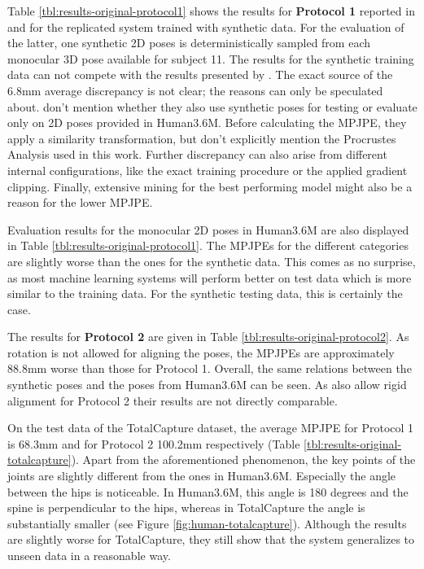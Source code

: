 



Table \ref{tbl:results-original-protocol1} shows the results for \textbf{Protocol 1} reported in \cite{drover18} and for the replicated system trained with synthetic data.
For the evaluation of the latter, one synthetic 2D poses is deterministically sampled from each monocular 3D pose available for subject 11.
The results for the synthetic training data can not compete with the results presented by \citet{drover18}.
The exact source of the 6.8mm average discrepancy is not clear; the reasons can only be speculated about.
\citet{drover18} don't mention whether they also use synthetic poses for testing or evaluate only on 2D poses provided in Human3.6M.
Before calculating the MPJPE, they apply a similarity transformation, but don't explicitly mention the Procrustes Analysis used in this work.
Further discrepancy can also arise from different internal configurations, like the exact training procedure or the applied gradient clipping.
Finally, extensive mining for the best performing model might also be a reason for the lower MPJPE.

Evaluation results for the monocular 2D poses in Human3.6M are also displayed in Table \ref{tbl:results-original-protocol1}.
The MPJPEs for the different categories are slightly worse than the ones for the synthetic data.
This comes as no surprise, as most machine learning systems will perform better on test data which is more similar to the training data.
For the synthetic testing data, this is certainly the case.

The results for \textbf{Protocol 2} are given in Table \ref{tbl:results-original-protocol2}.
As rotation is not allowed for aligning the poses, the MPJPEs are approximately 88.8mm worse than those for Protocol 1.
Overall, the same relations between the synthetic poses and the poses from Human3.6M can be seen.
As \citet{drover18} also allow rigid alignment for Protocol 2 their results are not directly comparable.

On the test data of the TotalCapture dataset, the average MPJPE for Protocol 1 is 68.3mm and for Protocol 2 100.2mm respectively (Table \ref{tbl:results-original-totalcapture}).
Apart from the aforementioned phenomenon, the key points of the joints are slightly different from the ones in Human3.6M.
Especially the angle between the hips is noticeable.
In Human3.6M, this angle is 180 degrees and the spine is perpendicular to the hips, whereas in TotalCapture the angle is substantially smaller (see Figure \ref{fig:human-totalcapture}).
Although the results are slightly worse for TotalCapture, they still show that the system generalizes to unseen data in a reasonable way.

